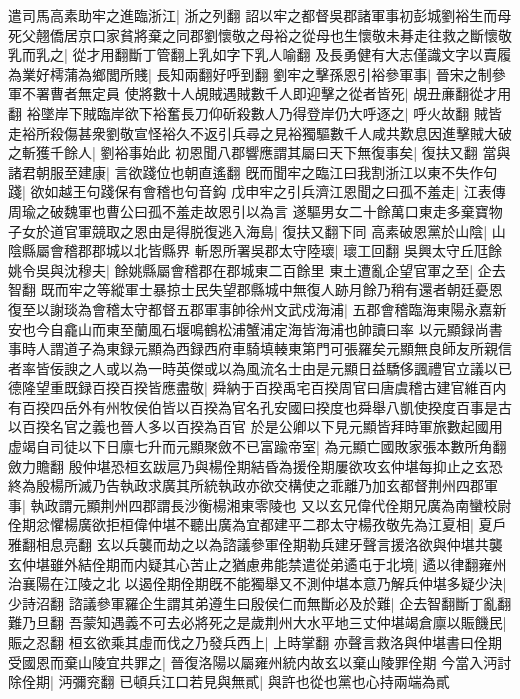 遣司馬高素助牢之進臨浙江|{
	浙之列翻}
詔以牢之都督吳郡諸軍事初彭城劉裕生而母死父翹僑居京口家貧將棄之同郡劉懷敬之母裕之從母也生懷敬未朞走往救之斷懷敬乳而乳之|{
	從才用翻斷丁管翻上乳如字下乳人喻翻}
及長勇健有大志僅識文字以賣履為業好樗蒲為鄉閭所賤|{
	長知兩翻好呼到翻}
劉牢之擊孫恩引裕參軍事|{
	晉宋之制參軍不署曹者無定員}
使將數十人覘賊遇賊數千人即迎擊之從者皆死|{
	覘丑亷翻從才用翻}
裕墜岸下賊臨岸欲下裕奮長刀仰斫殺數人乃得登岸仍大呼逐之|{
	呼火故翻}
賊皆走裕所殺傷甚衆劉敬宣怪裕久不返引兵尋之見裕獨驅數千人咸共歎息因進擊賊大破之斬獲千餘人|{
	劉裕事始此}
初恩聞八郡響應謂其屬曰天下無復事矣|{
	復扶又翻}
當與諸君朝服至建康|{
	言欲踐位也朝直遙翻}
旣而聞牢之臨江曰我割浙江以東不失作句踐|{
	欲如越王句踐保有會稽也句音鈎}
戊申牢之引兵濟江恩聞之曰孤不羞走|{
	江表傳周瑜之破魏軍也曹公曰孤不羞走故恩引以為言}
遂驅男女二十餘萬口東走多棄寶物子女於道官軍競取之恩由是得脱復逃入海島|{
	復扶又翻下同}
高素破恩黨於山陰|{
	山陰縣屬會稽郡郡城以北皆縣界}
斬恩所署吳郡太守陸瓌|{
	瓌工回翻}
吳興太守丘尫餘姚令吳與沈穆夫|{
	餘姚縣屬會稽郡在郡城東二百餘里}
東土遭亂企望官軍之至|{
	企去智翻}
既而牢之等縱軍士暴掠士民失望郡縣城中無復人跡月餘乃稍有還者朝廷憂恩復至以謝琰為會稽太守都督五郡軍事帥徐州文武戍海浦|{
	五郡會稽臨海東陽永嘉新安也今自龕山而東至蘭風石堰鳴鶴松浦蟹浦定海皆海浦也帥讀曰率}
以元顯録尚書事時人謂道子為東録元顯為西録西府車騎填輳東第門可張羅矣元顯無良師友所親信者率皆佞諛之人或以為一時英傑或以為風流名士由是元顯日益驕侈諷禮官立議以已德隆望重既録百揆百揆皆應盡敬|{
	舜納于百揆禹宅百揆周官曰唐虞稽古建官維百内有百揆四岳外有州牧侯伯皆以百揆為官名孔安國曰揆度也舜舉八凱使揆度百事是古以百揆名官之義也晉人多以百揆為百官}
於是公卿以下見元顯皆拜時軍旅數起國用虚竭自司徒以下日廪七升而元顯聚斂不已富踰帝室|{
	為元顯亡國敗家張本數所角翻斂力贍翻}
殷仲堪恐桓玄跋扈乃與楊佺期結昏為援佺期屢欲攻玄仲堪每抑止之玄恐終為殷楊所滅乃告執政求廣其所統執政亦欲交構使之乖離乃加玄都督荆州四郡軍事|{
	執政謂元顯荆州四郡謂長沙衡楊湘東零陵也}
又以玄兄偉代佺期兄廣為南蠻校尉佺期忿懼楊廣欲拒桓偉仲堪不聽出廣為宜都建平二郡太守楊孜敬先為江夏相|{
	夏戶雅翻相息亮翻}
玄以兵襲而劫之以為諮議參軍佺期勒兵建牙聲言援洛欲與仲堪共襲玄仲堪雖外結佺期而内疑其心苦止之猶慮弗能禁遣從弟遹屯于北境|{
	遹以律翻雍州治襄陽在江陵之北}
以遏佺期佺期旣不能獨舉又不測仲堪本意乃解兵仲堪多疑少決|{
	少詩沼翻}
諮議參軍羅企生謂其弟遵生曰殷侯仁而無斷必及於難|{
	企去智翻斷丁亂翻難乃旦翻}
吾蒙知遇義不可去必將死之是歲荆州大水平地三丈仲堪竭倉廪以賑饑民|{
	賑之忍翻}
桓玄欲乘其虛而伐之乃發兵西上|{
	上時掌翻}
亦聲言救洛與仲堪書曰佺期受國恩而棄山陵宜共罪之|{
	晉復洛陽以屬雍州統内故玄以棄山陵罪佺期}
今當入沔討除佺期|{
	沔彌兖翻}
已頓兵江口若見與無貳|{
	與許也從也黨也心持兩端為貳}
